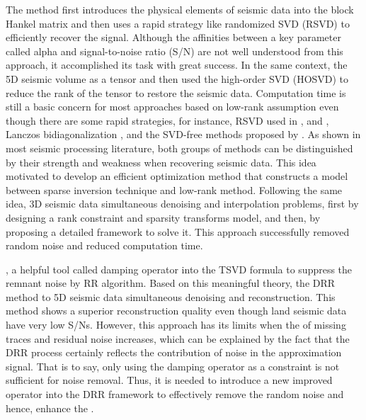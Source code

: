 The  method first introduces the physical elements of seismic data into the block Hankel matrix and then uses a rapid strategy like randomized SVD (RSVD) to efficiently recover the signal. Although the affinities between a key parameter called alpha and signal-to-noise ratio (S/N) are not well understood from this approach, it accomplished its task with great success. In the same context, \citet{kreimer2012tensor}  the 5D seismic volume as a tensor and then used the high-order SVD (HOSVD) to reduce the rank of the tensor to restore the seismic data. Computation time is still a basic concern for most approaches based on low-rank assumption even though there are some rapid strategies, for instance, RSVD used in \cite{rokhlin2009randomized}, \cite{oropeza2011simultaneous} and \cite{chen2016simultaneous}, Lanczos bidiagonalization \citep{gao2013fast}, and the SVD-free methods proposed by \cite{gao2015parallel}. As shown in most seismic processing literature, both groups of methods  can be distinguished by their strength and weakness when recovering seismic data. This idea motivated \cite{sternfels2015multidimensional} to develop an efficient optimization method that constructs a model between sparse inversion technique and low-rank method. Following the same idea, \citet{zhang2017hybrid}  3D seismic data simultaneous denoising and interpolation problems, first by designing a rank constraint and sparsity transforms model, and then, by proposing a detailed framework to solve it. This approach successfully removed random noise and reduced computation time. 

, \citet{huang2016damped}  a helpful tool called damping operator into the TSVD formula to suppress the remnant noise by RR algorithm. Based on this meaningful theory, 
\citet{chen2016simultaneous}  the DRR method \citep{huang2016damped} to 5D seismic data simultaneous denoising and reconstruction. This method shows a superior reconstruction quality even though land seismic data have very low S/Ns. However, this approach has its limits when the  of missing traces and residual noise increases, which can be explained by the fact that the DRR process certainly reflects the contribution of noise in the approximation signal. That is to say, only using the damping operator as a constraint is not sufficient for noise removal. Thus, it is needed to introduce a new improved operator into the DRR framework to effectively remove the random noise and hence, enhance the . 

